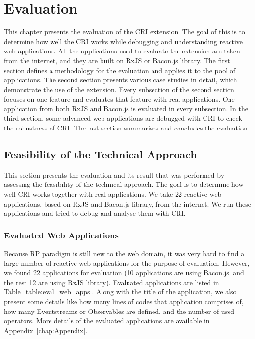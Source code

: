 \chapter{Evaluation} \label{chap:Evaluation}
This chapter presents the evaluation of the CRI extension. The goal of this is to determine how well the CRI works while debugging and understanding reactive web applications. All the applications used to evaluate the extension are taken from the internet, and they are built on RxJS or Bacon.js library. 
The first section defines a methodology for the evaluation and applies it to the pool of applications. The second section presents various case studies in detail, which demonstrate the use of the extension. Every subsection of the second section focuses on one feature and evaluates that feature with real applications. One application from both RxJS and Bacon.js is evaluated in every subsection. In the third section, some advanced web applications are debugged with CRI to check the robustness of CRI. The last section summarises and concludes the evaluation.


\section{Feasibility of the Technical Approach}

This section presents the evaluation and its result that was performed by assessing the feasibility of the technical
approach. The goal is to determine how well CRI works together with real applications. We take 22 reactive web applications, based on RxJS and Bacon.js library, from the internet. We run these applications and tried to debug and analyse them with CRI.

\subsection{Evaluated Web Applications}

Because RP paradigm is still new to the web domain, it was very hard to find a large number of reactive web applications for the purpose of evaluation. However, we found 22 applications for evaluation (10 applications are using Bacon.js, and the rest 12 are using RxJS library). Evaluated applications are listed in Table~\ref{table:eval_web_apps}. Along with the title of the application, we also present some details like how many lines of codes that application comprises of, how many Eventstreams or Observables are defined, and the number of used operators. More details of the evaluated applications are available in Appendix~\ref{chap:Appendix}.

